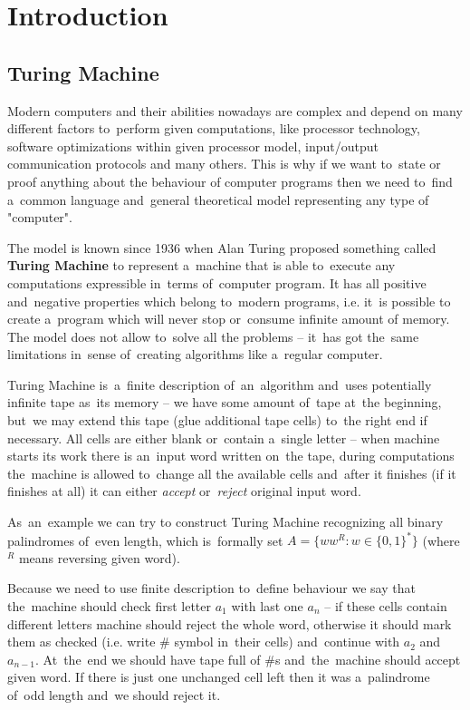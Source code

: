 \documentclass[english,shortabstract,mgr]{iithesis}
\author         {Jadwiga Pokorska}
\begin{document}

\chapter{Introduction}

\section{Turing Machine}

Modern computers and their abilities nowadays are complex and depend on many different factors
to~perform given computations, like processor technology, software optimizations within given
processor model, input/output communication protocols and many others. This is why if we want
to~state or proof anything about the behaviour of computer programs then we need to~find a~common
language and~general theoretical model representing any type of "computer".

The model is known since 1936 \cite{sipser2012ChurchTuring} when Alan Turing proposed something
called \textbf{Turing Machine}
to represent a~machine that is able to~execute any computations expressible in~terms of~computer program.
It has all positive and~negative properties which belong to~modern programs, i.e. it~is possible
to create a~program which will never stop or~consume infinite amount of memory. The model does not allow
to~solve all the problems -- it~has got the~same limitations in~sense of~creating algorithms
like a~regular computer.

Turing Machine is~a~finite description of~an~algorithm and~uses potentially infinite tape
as~its memory -- we have some amount of~tape at~the beginning, but~we may extend this tape
(glue additional tape cells) to~the right end if necessary. All cells are either blank
or~contain a~single letter -- when machine starts its work there is an~input word
written on~the tape, during computations the~machine is allowed to~change all the available
cells and~after it finishes (if it finishes at all) it can either \textit{accept}
or~\textit{reject} original input word.

As~an~example we can try to construct Turing Machine recognizing all binary palindromes of~even length,
which is~formally set $A = \{ ww^R : w \in \{0,1\}^* \}$ (where $^R$ means reversing given word).

Because we need to use finite description to~define behaviour we say that the~machine should
check first letter $a_1$ with last one $a_n$ -- if these cells contain different letters machine
should reject the whole word, otherwise it should mark them as checked (i.e. write $\#$ symbol in~their cells)
and~continue with $a_2$ and~$a_{n-1}$. At~the~end we should have tape full of $\#$s and~the~machine
should accept given word. If there is just one unchanged cell left then it was a~palindrome
of~odd length and~we should reject it.
\end{document}

